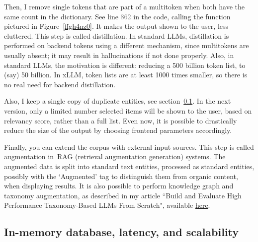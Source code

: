\documentclass[10pt]{article}
\begin{document}
{Then, I remove single tokens that are part of a multitoken when both have the same count in the dictionary. See
 line \textcolor{gray}{862} in the code, calling the function pictured in Figure~\ref{ffgh4nz0}. It makes the output shown to the user, less cluttered. 
This step is called \textcolor{index}{distillation}. In standard LLMs, distillation is performed on backend tokens using a different mechanism, since multitokens are usually absent; it may result in hallucinations if not done properly. Also, in standard LLMs, the motivation is different: reducing a 500 billion token list, to (say) 50 billion. In xLLM, token lists are at least 1000 times
 smaller, so there is no real need for backend distillation. 

Also, I keep a single copy of duplicate entities, see section~\ref{inmm}. In the next version, only a limited number selected items will be shown to the user, based on relevancy score, rather than a full list. Even now, it is possible to drastically reduce the size of the output by choosing frontend parameters accordingly. 

Finally, you can extend the corpus with external input sources. 
This step is called \textcolor{index}{augmentation} in~\textcolor{index}{RAG} (retrieval augmentation generation) systems. The augmented data is split into standard text entities, processed as standard entities, possibly with the
`Augmented' tag to distinguish them from organic content, when displaying results. It is also possible
 to perform \textcolor{index}{knowledge graph} and 
\textcolor{index}{taxonomy augmentation}, as described 
in my article ``Build and Evaluate High Performance Taxonomy-Based LLMs From Scratch", available \href{https://mltblog.com/3Ut9whN}{here}.


\subsection{In-memory database, latency, and scalability}\label{inmm}

}
\end{document}
